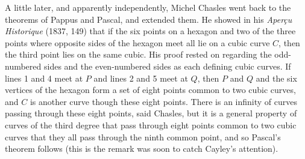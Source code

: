 A little later, and apparently independently, Michel Chasles went back to the theorems of Pappus and Pascal, and extended them.  He showed  in his \emph{Aper\c{c}u Historique} (1837, 149) that if the six points on a hexagon and two of the three points where opposite sides of the hexagon meet all lie on a cubic curve $C$, then the third point lies on the same cubic. His  proof rested on  regarding the odd-numbered sides and the even-numbered sides as each defining cubic curves. If lines 1 and 4 meet at $P$ and lines 2 and 5 meet at $Q$, then $P$ and $Q$ and the six vertices of the hexagon form a set of eight points common to two cubic curves, and $C$ is another curve though these eight points. There is an infinity of curves passing through these eight points, said Chasles, but it is a general property of  curves of the third degree that pass through eight points common to two cubic curves that they all pass through the ninth common point, and so Pascal's theorem follows (this is the remark was soon to catch Cayley's attention). 


